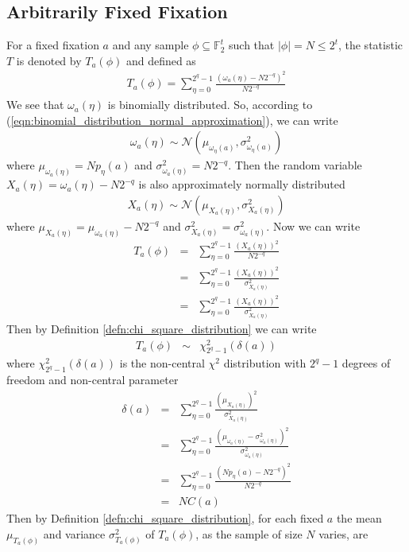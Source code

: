 \subsection{Arbitrarily Fixed Fixation}
For a fixed fixation $a$ and any sample $\phi \subseteq \mathbb{F}_{2}^{t}$ such that $|\phi| = N \leq 2^t$, the statistic $T$ is denoted by $T_{a}(\phi)$ and defined as
\begin{eqnarray}
T_{a}(\phi) = \displaystyle\sum_{\eta = 0}^{2^q-1} \frac{\left( \omega_{a}(\eta)-N2^{-q}\right)^2}{N2^{-q}} \label{eqn:T_fixed_a_variable_phi}
\end{eqnarray}
We see that $\omega_{a}(\eta)$ is binomially distributed. So, according to (\ref{eqn:binomial_distribution_normal_approximation}), we can write 
\begin{eqnarray*}
\omega_{a}(\eta) \sim \mathcal{N}\left(\mu_{\omega_{\eta}(a)},\sigma^{2}_{\omega_{\eta}(a)}\right)
\end{eqnarray*} where $\mu_{\omega_{a}(\eta)} = Np_{\eta}(a)$ and $\sigma^{2}_{\omega_{a}(\eta)} = N2^{-q}$. Then the random variable $X_{a}(\eta) = \omega_{a}(\eta)-N2^{-q}$  is also approximately normally distributed 
\begin{eqnarray*}
X_{a}(\eta) \sim \mathcal{N}(\mu_{X_{a}(\eta)},\sigma^{2}_{X_{a}(\eta)})
\end{eqnarray*}  where $\mu_{X_{a}(\eta)} = \mu_{\omega_{a}(\eta)} - N2^{-q}$  and $\sigma^{2}_{X_{a}(\eta)} = \sigma^{2}_{\omega_{a}(\eta)}$. Now we can write 
\begin{eqnarray*}
T_{a}(\phi) &=& \displaystyle\sum_{\eta = 0}^{2^q-1} \frac{\left(X_{a}(\eta) \right)^2}{N2^{-q}} \\
&=& \displaystyle\sum_{\eta = 0}^{2^q-1} \frac{\left( X_{a}(\eta) \right)^2}{\sigma^{2}_{X_{a}\left(\eta\right)}} \\
&=& \displaystyle\sum_{\eta = 0}^{2^q-1} \frac{\left(X_{a}(\eta) \right)^2}{\sigma^{2}_{X_{a}\left(\eta\right)}}
\end{eqnarray*} Then by Definition \ref{defn:chi_square_distribution} we can write
\begin{eqnarray}
T_{a}(\phi) &\sim & \chi_{2^q-1}^2(\delta(a))
\end{eqnarray}where $\chi_{2^q-1}^2(\delta(a))$ is the non-central $\chi^2$ distribution with $2^q-1$ degrees of freedom and non-central parameter 
\begin{eqnarray*}
\delta(a) &=& \displaystyle\sum_{\eta = 0}^{2^q-1} \frac{(\mu_{X_{a}(\eta)})^2}{\sigma^{2}_{X_{a}(\eta)}}\\ 
&=& \displaystyle\sum_{\eta = 0}^{2^q-1} \frac{(\mu_{\omega_{a}(\eta)} - \sigma^{2}_{\omega_{a}(\eta)})^2}{\sigma^{2}_{\omega_{a}(\eta)}}\\
&=&\displaystyle\sum_{\eta = 0}^{2^q-1} \frac{(Np_{\eta}(a)-N2^{-q})^2}{N2^{-q}} \\
&=& NC(a)
\end{eqnarray*} Then by Definition \ref{defn:chi_square_distribution}, for each fixed $a$ the mean $\mu_{T_{a}(\phi)}$ and variance $\sigma^2_{T_{a}(\phi)}$ of $T_{a}(\phi)$, as the sample of size $N$ varies, are 
